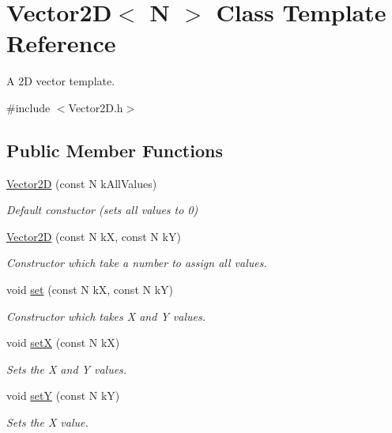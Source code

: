 \hypertarget{class_vector2_d}{\section{Vector2\+D$<$ N $>$ Class Template Reference}
\label{class_vector2_d}
}


A 2\+D vector template.  




{\ttfamily \#include $<$Vector2\+D.\+h$>$}

\subsection*{Public Member Functions}
\begin{DoxyCompactItemize}
\item 
\hyperlink{class_vector2_d_a289953197d4b246d198df2bd9997185e}{Vector2\+D} (const N k\+All\+Values)
\begin{DoxyCompactList}\small\item\em Default constuctor (sets all values to 0) \end{DoxyCompactList}\item 
\hyperlink{class_vector2_d_aac592df4ad03808d237ac31917ec902a}{Vector2\+D} (const N k\+X, const N k\+Y)
\begin{DoxyCompactList}\small\item\em Constructor which take a number to assign all values. \end{DoxyCompactList}\item 
void \hyperlink{class_vector2_d_a384d0e05609df11eef36118abc95789c}{set} (const N k\+X, const N k\+Y)
\begin{DoxyCompactList}\small\item\em Constructor which takes X and Y values. \end{DoxyCompactList}\item 
void \hyperlink{class_vector2_d_a63de9a5ad26934fc4d6df9111db3bd3f}{set\+X} (const N k\+X)
\begin{DoxyCompactList}\small\item\em Sets the X and Y values. \end{DoxyCompactList}\item 
void \hyperlink{class_vector2_d_acd9f8f5aa8f9b5ce8c4212638eee8c24}{set\+Y} (const N k\+Y)
\begin{DoxyCompactList}\small\item\em Sets the X value. \end{DoxyCompactList}\item 

\end{DoxyCompactItemize}

